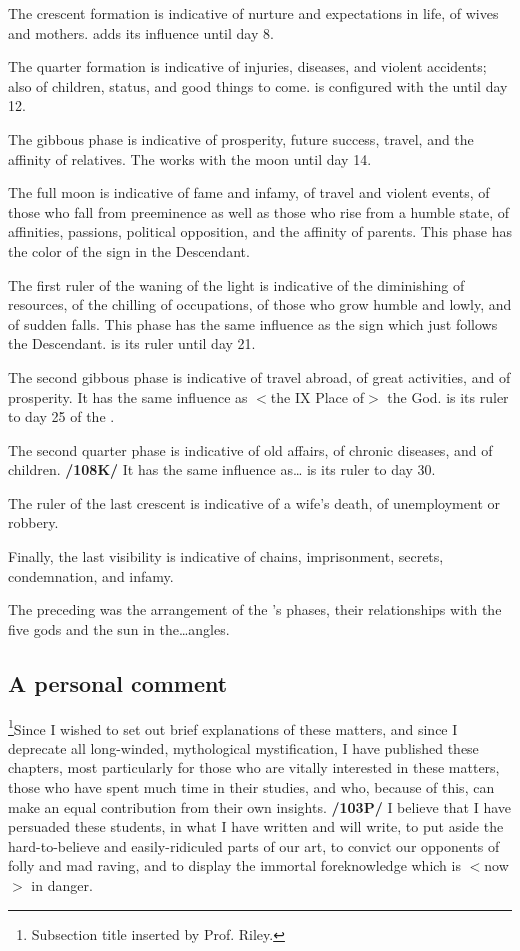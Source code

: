 The crescent formation is indicative of nurture and expectations in life, of wives and mothers. \Mercury\xspace adds its influence until day 8.

The quarter formation is indicative of injuries, diseases, and violent accidents; also of children, status, and good things to come. \Venus\xspace is configured with the \Moon\xspace until day 12.

The gibbous phase is indicative of prosperity, future success, travel, and the affinity of relatives. The \Sun\xspace works with the moon until day 14.

The full moon is indicative of fame and infamy, of travel and violent events, of those who fall from preeminence as well as those who rise from a humble state, of affinities, passions, political opposition, and the affinity of parents. This phase has the color of the sign in the Descendant.

The first ruler of the waning of the light is indicative of the diminishing of resources, of the chilling of occupations, of those who grow humble and lowly, and of sudden falls. This phase has the same influence as the sign which just follows the Descendant. \Mars\xspace is its ruler until day 21.

The second gibbous phase is indicative of travel abroad, of great activities, and of prosperity. It has the same influence as $<$the IX Place of$>$ the God. \Jupiter\xspace is its ruler to day 25 of the \Moon.

The second quarter phase is indicative of old affairs, of chronic diseases, and of children. \textbf{/108K/} It has
the same influence as\ldots \Saturn\xspace is its ruler to day 30.

The ruler of the last crescent is indicative of a wife’s death, of unemployment or robbery. 

Finally, the last visibility is indicative of chains, imprisonment, secrets, condemnation, and infamy.

The preceding was the arrangement of the \Moon’s phases, their relationships with the five gods and the sun in the\ldots angles.

\subsection{\textlangle A personal comment\textrangle}

\footnote{Subsection title inserted by Prof. Riley.}Since I wished to set out brief explanations of these matters, and since I deprecate all long-winded, mythological mystification, I have published these chapters, most particularly for those who are vitally interested in these matters, those who have spent much time in their studies, and who, because of this, can
make an equal contribution from their own insights. \textbf{/103P/} I believe that I have persuaded these students, in what I have written and will write, to put aside the hard-to-believe and easily-ridiculed parts of our art, to convict our opponents of folly and mad raving, and to display the immortal foreknowledge which is $<$now$>$ in danger. 

